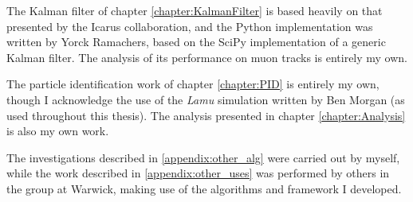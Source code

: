 The Kalman filter of chapter \ref{chapter:KalmanFilter} is based heavily on that presented by the Icarus collaboration, and the Python implementation was written by Yorck Ramachers, based on the SciPy implementation of a generic Kalman filter. The analysis of its performance on muon tracks is entirely my own.

The particle identification work of chapter \ref{chapter:PID} is entirely my own, though I acknowledge the use of the \emph{Lamu} simulation written by Ben Morgan (as used throughout this thesis). The analysis presented in chapter \ref{chapter:Analysis} is also my own work.

The investigations described in \ref{appendix:other_alg} were carried out by myself, while the work described in \ref{appendix:other_uses} was performed by others in the group at Warwick, making use of the algorithms and framework I developed. 
